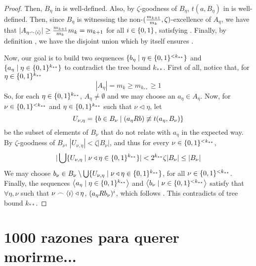 \begin{proof}
        Then, $B_\eta$ in  is well-defined.
        Also, by $\zeta$-goodness of $B_\eta$, $t(a, B_\eta)$ in  is well-defined.
        Then, since $B_\eta$ is witnessing the non-$( \frac{m_{k+1}}{m_{k}}, \zeta )$-excellence of $A_\eta$,
        we have that $|A_{\eta \frown \left< i \right>}| \geq \frac{m_{k+1}}{m_k} m_{k} = m_{k+1}$ for all
        $i \in \{ 0,1 \}$, satisfying .
        Finally, by definition , we have the disjoint union
         which by itself
        ensures .

        Now, our goal is to build two sequences $\{ b_\eta \mid \eta \in \{ 0,1 \}^{<k_{**}} \}$ and
        $\{ a_\eta \mid \eta \in \{ 0,1 \}^{k_{**}} \}$ to contradict the tree bound $k_{**}$.
        First of all, notice that, for $\eta \in \{ 0,1 \}^{k_{**}}$
        \[
            |A_\eta| = m_k \geq m_{k_{**}} \geq 1
        \]
        So, for each $\eta \in \{ 0,1 \}^{k_{**}}$, $A_\eta \neq \emptyset$ and we may choose an $a_\eta \in A_\eta$.
        Now, for $\nu \in \{ 0,1 \}^{<k_{**}}$ and $\eta \in \{ 0,1 \}^{k_{**}}$ such that $\nu \triangleleft \eta$, let
        \[
            U_{\nu,\eta} = \{ b \in B_\nu \mid (a_\eta R b) \not\equiv t(a_\eta, B_\nu) \}
        \]
        be the subset of elements of $B_\nu$ that do not relate with $a_\eta$ in the expected way.
        By $\zeta$-goodness of $B_\nu$, $|U_{\nu, \eta}| < \zeta |B_\nu|$, and thus for every $\nu \in \{ 0,1 \}^{<k_{**}}$,
        \[
            | \bigcup\{  U_{\nu,\eta} \mid \nu \triangleleft \eta \in \{ 0,1 \}^{k_{**}} \} | <
            2^{k_{**}} \zeta |B_\nu| \leq |B_\nu|
        \]
        We may choose $b_\nu \in B_\nu \setminus \bigcup\{ U_{\nu,\eta} \mid \nu \triangleleft \eta \in \{ 0,1 \}^{k_{**}} \}$,
        for all $\nu \in \{ 0,1 \}^{<k_{**}}$.
        Finally, the sequences $\left< a_\eta \mid \eta \in \{ 0,1 \}^{k_{**}} \right>$ and
        $\left< b_\nu \mid \nu \in \{ 0,1 \}^{<k_{**}} \right>$ satisfy that $\forall \eta, \nu$ such that
        $\nu \frown \left< i \right> \triangleleft \eta$, $( a_\eta R b_\nu )^i$, which follows
        .
        This contradicts  of tree bound $k_{**}$.
    \end{proof}

\vfill\newpage \section{1000 razones para querer morirme...}